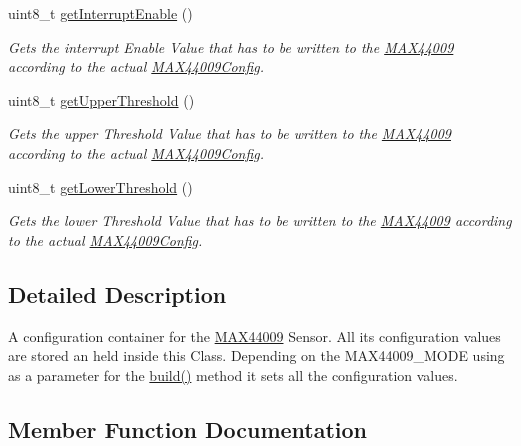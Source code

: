 \begin{DoxyCompactItemize}
uint8\+\_\+t \hyperlink{class_m_a_x44009_config_a5de7b8993ac3ed575358b11158448637}{get\+Interrupt\+Enable} ()
\begin{DoxyCompactList}\small\item\em Gets the interrupt Enable Value that has to be written to the \hyperlink{class_m_a_x44009}{M\+A\+X44009} according to the actual \hyperlink{class_m_a_x44009_config}{M\+A\+X44009\+Config}. \end{DoxyCompactList}\item 
uint8\+\_\+t \hyperlink{class_m_a_x44009_config_ac8271a8451e77deded7ba370e61014d3}{get\+Upper\+Threshold} ()
\begin{DoxyCompactList}\small\item\em Gets the upper Threshold Value that has to be written to the \hyperlink{class_m_a_x44009}{M\+A\+X44009} according to the actual \hyperlink{class_m_a_x44009_config}{M\+A\+X44009\+Config}. \end{DoxyCompactList}\item 
uint8\+\_\+t \hyperlink{class_m_a_x44009_config_a48dcfdf66b67d7581199dd18f7d2b04b}{get\+Lower\+Threshold} ()
\begin{DoxyCompactList}\small\item\em Gets the lower Threshold Value that has to be written to the \hyperlink{class_m_a_x44009}{M\+A\+X44009} according to the actual \hyperlink{class_m_a_x44009_config}{M\+A\+X44009\+Config}. \end{DoxyCompactList}\end{DoxyCompactItemize}


\subsection{Detailed Description}
A configuration container for the \hyperlink{class_m_a_x44009}{M\+A\+X44009} Sensor. All its configuration values are stored an held inside this Class. Depending on the M\+A\+X44009\+\_\+\+M\+O\+D\+E using as a parameter for the \hyperlink{class_m_a_x44009_config_a2879fcff8331e54ab1ee8bf54a386f6e}{build()} method it sets all the configuration values. 

\subsection{Member Function Documentation}
\hypertarget{class_m_a_x44009_config_a2879fcff8331e54ab1ee8bf54a386f6e}{}
